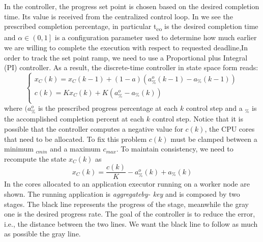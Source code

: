 In the controller, the progress set point is chosen based on the desired completion time. Its value is received from the centralized control loop. In  we see the prescribed completion percentage, in particular t\textsubscript{co} is the desired completion time and  $\alpha \in \left(0,1\right]$ is a configuration parameter used to determine how much earlier we are willing to complete the execution with respect to requested deadline,In order to track the set point ramp, we need to use a Proportional plus Integral (PI) controller.
As a result, the discrete-time controller in state space form reads:
\[\begin{cases}
x_{C}(k) = x_{C}(k - 1) + (1 - a)(a _{\%}^{o}(k - 1) - a _{\%}(k - 1))\\
c(k) = Kx_{C}(k) + K(a _{\%}^{o} - a _{\%}(k))\\
\end{cases}\]
where $(a _{\%}^{o}$ is the prescribed progress percentage at each $k$ control
step and a $_{\%}$ is the accomplished completion percent at each $k$ control
step. Notice that it is possible that the controller computes a negative value for $c(k)$, the CPU cores that need to be allocated. To fix this problem $c(k)$ must be clamped between a minimum $_{cmin}$ and a maximum $c_{max}$. To maintain consistency, we need to recompute the state $x_{C}(k)$ as 
\[x_{C}(k) = \dfrac{c(k)}{K} - a _{\%}^{o}(k) + a _{\%}(k)\] 
In  the cores allocated to an application executor running
on a worker node are shown. The running application is \textit{aggregateby-
key} and is composed by two stages. The black line represents the
progress of the stage, meanwhile the gray one is the desired progress
rate. The goal of the controller is to reduce the error, i.e., the distance
between the two lines. We want the black line to follow as much as
possible the gray line.

